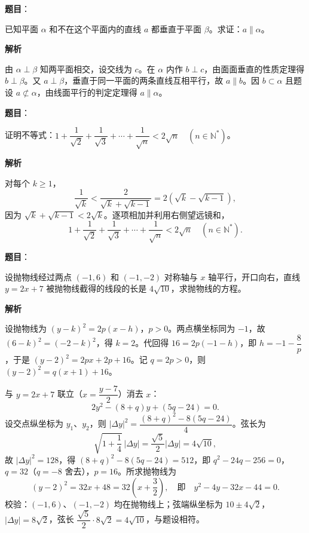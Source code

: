 \begin{answer}

\textbf{题目}：

已知平面 $\alpha$ 和不在这个平面内的直线 $a$ 都垂直于平面 $\beta$。求证：$a\parallel\alpha$。

\textbf{解析}

由 $\alpha\perp\beta$ 知两平面相交，设交线为 $c$。在 $\alpha$ 内作 $b\perp c$，由面面垂直的性质定理得 $b\perp\beta$。又 $a\perp\beta$，垂直于同一平面的两条直线互相平行，故 $a\parallel b$。因 $b\subset\alpha$ 且题设 $a\not\subset\alpha$，由线面平行的判定定理得 $a\parallel\alpha$。


\end{answer}
\begin{answer}

\textbf{题目}：

证明不等式：$1+\dfrac1{\sqrt2}+\dfrac1{\sqrt3}+\cdots+\dfrac1{\sqrt n}<2\sqrt n\quad(n\in\mathbb N^*)$。

\textbf{解析}

对每个 $k\ge1$，
\nopagebreak[4]
\[
\frac{1}{\sqrt{k}}<\frac{2}{\sqrt{k}+\sqrt{k-1}}=2\left(\sqrt{k}-\sqrt{k-1}\right),
\]
因为 $\sqrt{k}+\sqrt{k-1}<2\sqrt{k}$。逐项相加并利用右侧望远镜和，
\nopagebreak[4]
\[
1+\frac{1}{\sqrt2}+\frac{1}{\sqrt3}+\cdots+\frac{1}{\sqrt n}<2\sqrt n\quad(n\in\mathbb N^*).
\]


\end{answer}
\begin{answer}

\textbf{题目}：

设抛物线经过两点 $(-1,6)$ 和 $(-1,-2)$ 对称轴与 $x$ 轴平行，开口向右，直线 $y=2x+7$ 被抛物线截得的线段的长是 $4\sqrt{10}$，求抛物线的方程。

\textbf{解析}

设抛物线为 $(y-k)^2=2p(x-h)$，$p>0$。两点横坐标同为 $-1$，故 $(6-k)^2=(-2-k)^2$，得 $k=2$。代回得 $16=2p(-1-h)$，即 $h=-1-\dfrac{8}{p}$，于是 $(y-2)^2=2px+2p+16$。记 $q=2p>0$，则 $(y-2)^2=q(x+1)+16$。

与 $y=2x+7$ 联立（$x=\dfrac{y-7}{2}$）消去 $x$：
\nopagebreak[4]
\[
2y^2-(8+q)y+(5q-24)=0.
\]
设交点纵坐标为 $y_1$、$y_2$，则 $|\Delta y|^2=\dfrac{(8+q)^2-8(5q-24)}{4}$。弦长为
\nopagebreak[4]
\[
\sqrt{1+\frac14}\,|\Delta y|=\frac{\sqrt5}{2}|\Delta y|=4\sqrt{10},
\]
故 $|\Delta y|^2=128$，得 $(8+q)^2-8(5q-24)=512$，即 $q^2-24q-256=0$，$q=32$（$q=-8$ 舍去），$p=16$。所求抛物线为
\nopagebreak[4]
\[
(y-2)^2=32x+48=32\left(x+\frac32\right),\quad\text{即}\quad y^2-4y-32x-44=0.
\]
校验：$(-1,6)$、$(-1,-2)$ 均在抛物线上；弦端纵坐标为 $10\pm4\sqrt2$，$|\Delta y|=8\sqrt2$，弦长 $\dfrac{\sqrt5}{2}\cdot8\sqrt2=4\sqrt{10}$，与题设相符。


\end{answer}
